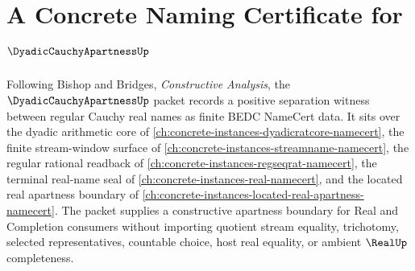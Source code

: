 \chapter{A Concrete Naming Certificate for $\DyadicCauchyApartnessUp$}
\label{ch:concrete-instances-dyadic-cauchy-apartness-namecert}

Following Bishop and Bridges, \emph{Constructive Analysis}, the $\DyadicCauchyApartnessUp$ packet records a positive separation witness between regular Cauchy real names as finite BEDC NameCert data. It sits over the dyadic arithmetic core of \autoref{ch:concrete-instances-dyadicratcore-namecert}, the finite stream-window surface of \autoref{ch:concrete-instances-streamname-namecert}, the regular rational readback of \autoref{ch:concrete-instances-regseqrat-namecert}, the terminal real-name seal of \autoref{ch:concrete-instances-real-namecert}, and the located real apartness boundary of \autoref{ch:concrete-instances-located-real-apartness-namecert}. The packet supplies a constructive apartness boundary for Real and Completion consumers without importing quotient stream equality, trichotomy, selected representatives, countable choice, host real equality, or ambient $\RealUp$ completeness.


